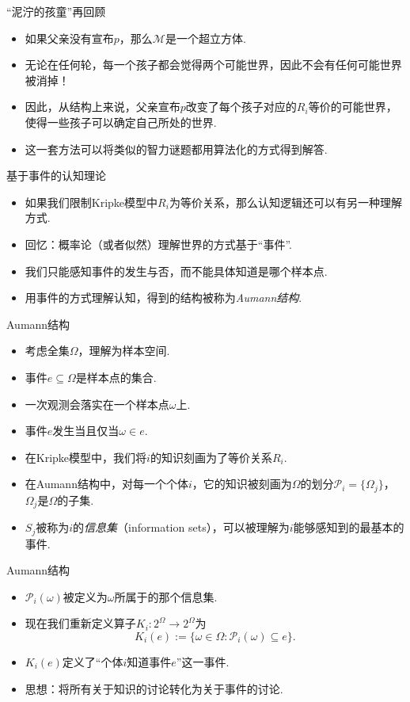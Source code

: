 \begin{frame}{“泥泞的孩童”再回顾}
\begin{itemize}
    \item 如果父亲没有宣布$p$，那么$\mathcal M$是一个超立方体.
    \item 无论在任何轮，每一个孩子都会觉得两个可能世界，因此不会有任何可能世界被消掉！
    \item 因此，从结构上来说，父亲宣布$p$改变了每个孩子对应的$R_i$等价的可能世界，使得一些孩子可以确定自己所处的世界.
    \item 这一套方法可以将类似的智力谜题都用算法化的方式得到解答.
\end{itemize}
\end{frame}

\begin{frame}{基于事件的认知理论}
\begin{itemize}
    \item 如果我们限制Kripke模型中$R_i$为等价关系，那么认知逻辑还可以有另一种理解方式.
    \item 回忆：概率论（或者似然）理解世界的方式基于“事件”.
    \item 我们只能感知事件的发生与否，而不能具体知道是哪个样本点.
    \item 用事件的方式理解认知，得到的结构被称为\emph{Aumann结构}.
\end{itemize}
\end{frame}

\begin{frame}{Aumann结构}
\begin{itemize}
    \item 考虑全集$\Omega$，理解为样本空间.
    \item 事件$e\subseteq \Omega$是样本点的集合.
    \item 一次观测会落实在一个样本点$\omega$上.
    \item 事件$e$发生当且仅当$\omega\in e$.
    \item 在Kripke模型中，我们将$i$的知识刻画为了等价关系$R_i$.
    \item 在Aumann结构中，对每一个个体$i$，它的知识被刻画为$\Omega$的划分$\mathcal P_i=\{\Omega_j\}$，$\Omega_j$是$\Omega$的子集.
    \item $S_j$被称为$i$的\emph{信息集}（information sets），可以被理解为$i$能够感知到的最基本的事件.
\end{itemize}    
\end{frame}

\begin{frame}{Aumann结构}
\begin{itemize}
    \item $\mathcal P_i(\omega)$被定义为$\omega$所属于的那个信息集.
    \item 现在我们重新定义算子$K_i:2^\Omega\to 2^\Omega$为
    \[K_i(e):=\{\omega\in\Omega:\mathcal P_i(\omega)\subseteq e\}.\]
    \item $K_i(e)$定义了“个体$i$知道事件$e$”这一事件.
    \item 思想：将所有关于知识的讨论转化为关于事件的讨论.
\end{itemize}
\end{frame}

